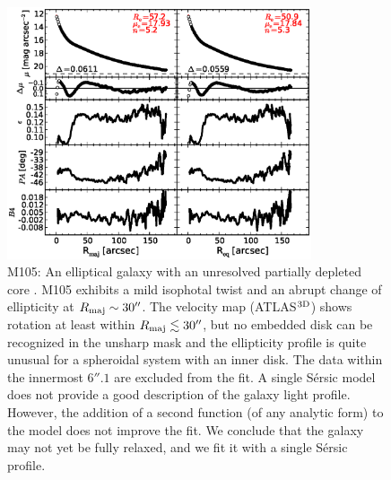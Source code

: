 \documentclass[preprint2]{emulateapj}
\newcommand{\fitfigurewidth}{0.8\textwidth}
\begin{document}
  \begin{figure}[h]
  \begin{center}
  \includegraphics[width=\fitfigurewidth]{m105_1Dfit.eps}
  \caption{M105: 
  An elliptical galaxy with an unresolved partially depleted core \citep{rusli2013}. %
  M105 exhibits a mild isophotal twist and an abrupt change of ellipticity at $R_{\rm maj} \sim 30''$.
  The velocity map (ATLAS$^{\rm 3D}$) shows rotation at least within $R_{\rm maj} \lesssim 30''$, 
  but no embedded disk can be recognized in the unsharp mask 
  and the ellipticity profile is quite unusual for a spheroidal system with an inner disk.
  The data within the innermost $6''.1$ are excluded from the fit.
  A single S\'ersic model does not provide a good description of the galaxy light profile.
  However, the addition of a second function (of any analytic form) to the model does not improve the fit.
  We conclude that the galaxy may not yet be fully relaxed, and we fit it with a single S\'ersic profile. 
  }
  \end{center}
  \end{figure}
\end{document}

